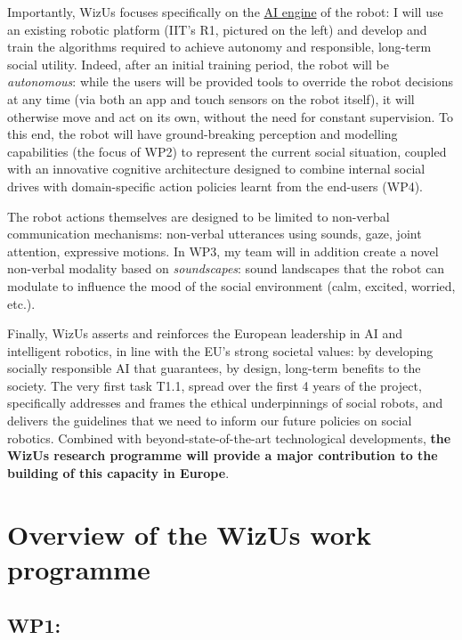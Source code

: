 \documentclass[11pt,a4paper]{report}
\newcommand{\project}{WizUs\xspace}
\begin{document}
Importantly, \project focuses specifically on the \ul{AI engine} of the robot: I
will use an existing robotic platform (IIT's R1, pictured on the left) and
develop and train the algorithms required to achieve autonomy and responsible,
long-term social utility. Indeed, after an initial training period, the robot will
be \emph{autonomous}: while the users will be provided tools to override
the robot decisions at any time (via both an app and touch sensors on the robot
itself), it will otherwise move and act on its own, without the need for
constant supervision. To this end, the robot will have ground-breaking
perception and modelling capabilities (the focus of WP2) to represent the
current social situation, coupled with an innovative cognitive architecture
designed to combine internal social drives with domain-specific action policies
learnt from the end-users (WP4).

The robot actions themselves are designed to be limited to non-verbal
communication mechanisms: non-verbal utterances using sounds, gaze, joint
attention, expressive motions. In WP3, my team will in addition create a novel
non-verbal modality based on \emph{soundscapes}: sound landscapes that the robot
can modulate to influence the mood of the social environment (calm, excited,
worried, etc.).

Finally, \project asserts and reinforces the European leadership in AI and
intelligent robotics, in line with the EU's strong societal values: by developing
socially responsible AI that guarantees, by design, long-term benefits to the
society. The very first task T1.1, spread over the first 4 years of the project,
specifically addresses and frames the ethical underpinnings of social robots,
and delivers the guidelines that we need to inform our future policies on social
robotics. Combined with beyond-state-of-the-art technological developments,
\textbf{the \project research programme will provide a major contribution to the
building of this capacity in Europe}. 

\section{Overview of the \project work programme}


\subsection{WP1: \textbf{\wpOne}}
\end{document}
